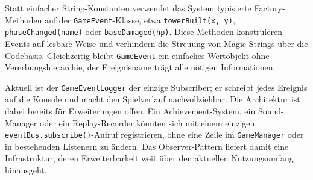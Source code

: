 Statt einfacher String-Konstanten verwendet das System typisierte Factory-Methoden
auf der \texttt{GameEvent}-Klasse, etwa \texttt{towerBuilt(x,~y)},
\texttt{phaseChanged(name)} oder \texttt{baseDamaged(hp)}.
Diese Methoden konstruieren Events auf lesbare Weise und verhindern die Streuung
von Magic-Strings über die Codebasis. Gleichzeitig bleibt \texttt{GameEvent}
ein einfaches Wertobjekt ohne Vererbungshierarchie, der Ereignisname trägt
alle nötigen Informationen.

Aktuell ist der \texttt{GameEventLogger} der einzige Subscriber; er schreibt
jedes Ereignis auf die Konsole und macht den Spielverlauf nachvollziehbar. Die
Architektur ist dabei bereits für Erweiterungen offen. Ein Achievement-System,
ein Sound-Manager oder ein Replay-Recorder könnten sich mit einem einzigen
\texttt{eventBus.subscribe()}-Aufruf registrieren, ohne eine Zeile im
\texttt{GameManager} oder in bestehenden Listenern zu ändern. Das
Observer-Pattern liefert damit eine Infrastruktur, deren Erweiterbarkeit weit
über den aktuellen Nutzungsumfang hinausgeht.
